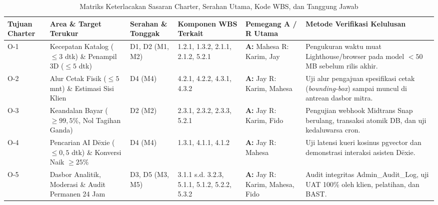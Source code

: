 \documentclass[11pt,a4paper]{article}
\newcommand{\thdr}[1]{\centering\arraybackslash\textbf{#1}}
\renewcommand{\arraystretch}{1.24}
\begin{document}
\begin{table}[H]
\centering
\caption{Matriks Keterlacakan Sasaran Charter, Serahan Utama, Kode WBS, dan Tanggung Jawab}
{\renewcommand{\arraystretch}{1.14}\footnotesize
\begin{tabularx}{\textwidth}{| C{1.3cm} | L{3.3cm} | C{1.3cm} | L{3.5cm} | C{1.8cm} | Y |}
\hline
{} \thdr{Tujuan Charter} & \thdr{Area \& Target Terukur} & \thdr{Serahan \& Tonggak} & \thdr{Komponen WBS Terkait} & \thdr{Pemegang A / R Utama} & \thdr{Metode Verifikasi Kelulusan} \\
\hline
O-1 & Kecepatan Katalog ($\le 3$ dtk) \& Penampil 3D ($\le 5$ dtk) & D1, D2 (M1, M2) & 1.2.1, 1.3.2, 2.1.1, 2.1.2, 5.2.1 & \textbf{A:} Mahesa \newline R: Karim, Jay & Pengukuran waktu muat Lighthouse/browser pada model $< 50$ MB sebelum rilis akhir. \\
\hline
O-2 & Alur Cetak Fisik ($\le 5$ mnt) \& Estimasi Sisi Klien & D4 (M4) & 4.2.1, 4.2.2, 4.3.1, 4.3.2 & \textbf{A:} Jay \newline R: Karim, Mahesa & Uji alur pengajuan spesifikasi cetak (\textit{bounding-box}) sampai muncul di antrean dasbor mitra. \\
\hline
O-3 & Keandalan Bayar ($\ge 99{,}5\%$, Nol Tagihan Ganda) & D2 (M2) & 2.3.1, 2.3.2, 2.3.3, 5.2.1 & \textbf{A:} Jay \newline R: Karim, Fido & Pengujian webhook Midtrans Snap berulang, transaksi atomik DB, dan uji kedaluwarsa cron. \\
\hline
O-4 & Pencarian AI D\={e}xie ($\le 0{,}5$ dtk) \& Konversi Naik $\ge 25\%$ & D4 (M4) & 1.3.1, 4.1.1, 4.1.2 & \textbf{A:} Jay \newline R: Mahesa & Uji latensi kueri kosinus pgvector dan demonstrasi interaksi asisten D\={e}xie. \\
\hline
O-5 & Dasbor Analitik, Moderasi \& Audit Permanen 24 Jam & D3, D5 (M3, M5) & 3.1.1 s.d. 3.2.3, 5.1.1, 5.1.2, 5.2.2, 5.3.2 & \textbf{A:} Jay \newline R: Karim, Mahesa, Fido & Audit integritas Admin\_Audit\_Log, uji UAT 100\% oleh klien, pelatihan, dan BAST. \\
\hline
\end{tabularx}}
\label{tab:traceability}
\end{table}

\clearpage
\end{document}
